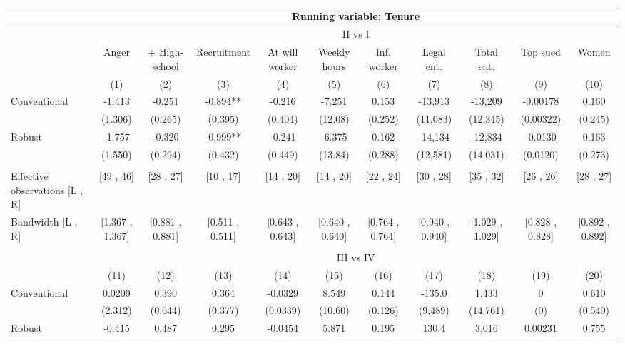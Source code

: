 \begin{tabular}{lcccccccccc}
\toprule
      & \multicolumn{10}{c}{Running variable: Tenure} \\
\midrule
      & \multicolumn{10}{c}{II vs I} \\
\midrule
\midrule
      & Anger & + High-school & Recruitment & At will worker & Weekly hours & Inf. worker & Legal ent. & Total ent. & Top sued & Women \\
\midrule
      & (1)   & (2)   & (3)   & (4)   & (5)   & (6)   & (7)   & (8)   & (9)   & (10) \\
\midrule
\midrule
Conventional & -1.413 & -0.251 & -0.894** & -0.216 & -7.251 & 0.153 & -13,913 & -13,209 & -0.00178 & 0.160 \\
      & (1.306) & (0.265) & (0.395) & (0.404) & (12.08) & (0.252) & (11,083) & (12,345) & (0.00322) & (0.245) \\
Robust & -1.757 & -0.320 & -0.999** & -0.241 & -6.375 & 0.162 & -14,134 & -12,834 & -0.0130 & 0.163 \\
      & (1.550) & (0.294) & (0.432) & (0.449) & (13.84) & (0.288) & (12,581) & (14,031) & (0.0120) & (0.273) \\
      &       &       &       &       &       &       &       &       &       &  \\
\midrule
Effective observations [L , R] & [49 , 46] & [28 , 27] & [10 , 17] & [14 , 20] & [14 , 20] & [22 , 24] & [30 , 28] & [35 , 32] & [26 , 26] & [28 , 27] \\
Bandwidth [L , R] & [1.367 , 1.367] & [0.881 , 0.881] & [0.511 , 0.511] & [0.643 , 0.643] & [0.640 , 0.640] & [0.764 , 0.764] & [0.940 , 0.940] & [1.029 , 1.029] & [0.828 , 0.828] & [0.892 , 0.892] \\
\midrule
\midrule
      &       &       &       &       &       &       &       &       &       &  \\
\midrule
      & \multicolumn{10}{c}{III vs IV} \\
\midrule
\midrule
      & (11)  & (12)  & (13)  & (14)  & (15)  & (16)  & (17)  & (18)  & (19)  & (20) \\
\midrule
\midrule
Conventional & 0.0209 & 0.390 & 0.364 & -0.0329 & 8.549 & 0.144 & -135.0 & 1,433 & 0     & 0.610 \\
      & (2.312) & (0.644) & (0.377) & (0.0339) & (10.60) & (0.126) & (9,489) & (14,761) & (0)   & (0.540) \\
Robust & -0.415 & 0.487 & 0.295 & -0.0454 & 5.871 & 0.195 & 130.4 & 3,016 & 0.00231 & 0.755 \\

\end{tabular}
